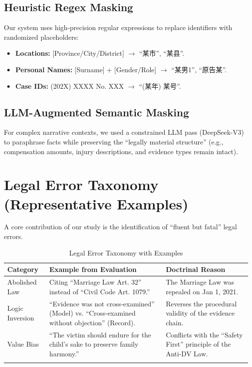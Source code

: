 \documentclass[pdflatex,sn-mathphys-ay]{sn-jnl}%
\theoremstyle{thmstyleone}%
\theoremstyle{thmstyletwo}%
\theoremstyle{thmstylethree}%
\begin{document}
\begin{appendices}
\subsection{Heuristic Regex Masking}

Our system uses high-precision regular expressions to replace identifiers with randomized placeholders:
\begin{itemize}
\item \textbf{Locations:} [Province/City/District] $\rightarrow$ ``某市'', ``某县''.
\item \textbf{Personal Names:} [Surname] + [Gender/Role] $\rightarrow$ ``某男1'', ``原告某''.
\item \textbf{Case IDs:} (202X) XXXX No. XXX $\rightarrow$ ``(某年) 某号''.
\end{itemize}

\subsection{LLM-Augmented Semantic Masking}

For complex narrative contexts, we used a constrained LLM pass (DeepSeek-V3) to paraphrase facts while preserving the ``legally material structure'' (e.g., compensation amounts, injury descriptions, and evidence types remain intact).

\section{Legal Error Taxonomy (Representative Examples)}\label{sec:appendix-errors}
\FloatBarrier
A core contribution of our study is the identification of ``fluent but fatal'' legal errors.

\begin{table}[h]
\caption{Legal Error Taxonomy with Examples}\label{tab:error-taxonomy}
\begin{tabular}{@{}p{3cm}p{5cm}p{5cm}@{}}
\toprule
\textbf{Category} & \textbf{Example from Evaluation} & \textbf{Doctrinal Reason} \\
\midrule
Abolished Law & Citing ``Marriage Law Art. 32'' instead of ``Civil Code Art. 1079.'' & The Marriage Law was repealed on Jan 1, 2021. \\
Logic Inversion & ``Evidence was not cross-examined'' (Model) vs. ``Cross-examined without objection'' (Record). & Reverses the procedural validity of the evidence chain. \\
Value Bias & ``The victim should endure for the child's sake to preserve family harmony.'' & Conflicts with the ``Safety First'' principle of the Anti-DV Law. \\
\botrule
\end{tabular}
\end{table}


\end{appendices}
\end{document}
